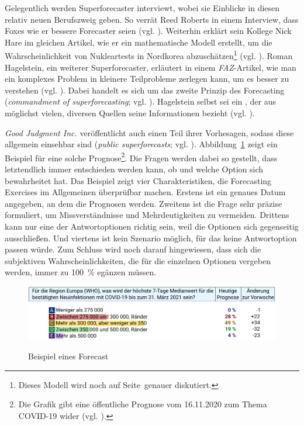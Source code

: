 Gelegentlich werden Superforecaster interviewt, wobei sie Einblicke in diesen
relativ neuen Berufszweig geben. So verrät Reed Roberts in einem Interview,
dass Foxes wie er bessere Forecaster seien (vgl. \cite{Burton}). Weiterhin erklärt sein Kollege Nick Hare im
gleichen Artikel, wie er ein mathematische Modell erstellt, um die Wahrscheinlichkeit von Nukleartests in
Nordkorea abzuschätzen\footnote{ 
Dieses Modell wird noch auf Seite~\xcom genauer diskutiert.
} (vgl. \cite{Burton}). Roman Hagelstein, ein weiterer Superforecaster,
erläutert in einem \emph{FAZ}-Artikel, wie man ein komplexes Problem in kleinere Teilprobleme zerlegen kann, um
es besser zu verstehen (vgl. \cite{Juergs}). Dabei handelt es sich um das zweite Prinzip des Forecasting
(\emph{commandment of superforecasting}; vgl. \cite{Jackson}). Hagelstein selbst 
sei ein \grqq{}, der aus möglichst vielen, diversen
Quellen seine Informationen bezieht (vgl. \cite{Juergs}).

\emph{Good Judgment Inc.} veröffentlicht auch einen Teil ihrer Vorhesagen, sodass diese
allgemein einsehbar sind (\emph{public superforecasts}; vgl. \cite{GJP_Ink}).
Abbildung~\ref{pic:Forecast} zeigt ein Beispiel für eine solche Prognose\footnote{
Die Grafik gibt eine öffentliche Prognose vom 16.11.2020 zum Thema COVID-19 wider (vgl. \cite{GJP_Ink_F}).
}. Die Fragen werden dabei so gestellt, dass letztendlich immer entschieden werden
kann, ob und welche Option sich bewahrheitet hat. Das Beispiel zeigt vier
Charakteristiken, die Forecasting Exercises im Allgemeinen überprüfbar machen.
Erstens ist ein genaues Datum angegeben, an dem die Prognosen \grqq{} werden.
Zweitens ist die Frage sehr präzise formuliert, um Missverständnisse und Mehrdeutigkeiten
zu vermeiden. Drittens kann nur eine der Antwortoptionen richtig sein, weil die Optionen
sich gegenseitig ausschließen. Und viertens ist kein Szenario möglich, für das keine
Antwortoption passen würde. Zum Schluss wird noch darauf hingewiesen, dass sich
die subjektiven Wahrscheinlichkeiten, die für die einzelnen Optionen vergeben werden,
immer zu 100~\% egänzen müssen.
 
\begin{figure}%
\centering
\caption{Beispiel eines Forecast}
\includegraphics[scale=0.95]{Grafiken/Forecast_Ink.pdf} 
\label{pic:Forecast}
\end{figure}

